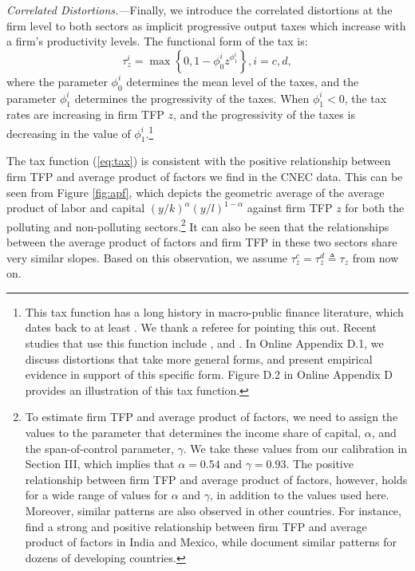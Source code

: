 \documentclass[AEJ]{AEA}
\begin{document}
\textit{Correlated Distortions.---}Finally, we introduce the correlated distortions at the firm level to both sectors as implicit progressive output taxes which increase with a firm's productivity levels. The functional form of the tax is:
\begin{equation}
    \tau^i_z = \max \left\{ 0, 1 - \phi_0^i z^{\phi_1^i} \right\}, i=c,d,
\label{eq:tax}
\end{equation}
where the parameter $\phi_0^i$ determines the mean level of the taxes, and the parameter $\phi_1^i$ determines the progressivity of the taxes. When $\phi_1^i<0$, the tax rates are increasing in firm TFP $z$, and the progressivity of the taxes is decreasing in the value of $\phi_1^i$.\footnote{This tax function has a long history in macro-public finance literature, which dates back to at least \citet{Benabou:2002}. We thank a referee for pointing this out. Recent studies that use this function include \citet{HsiehKlenow:2014}, \citet{BentoRestuccia:2016} and \citet{Guneretal:2017}. In Online Appendix D.1, we discuss distortions that take more general forms, and present empirical evidence in support of this specific form. Figure D.2 in Online Appendix D provides an illustration of this tax function.}

The tax function (\ref{eq:tax}) is consistent with the positive relationship between firm TFP and average product of factors we find in the CNEC data. This can be seen from Figure \ref{fig:apf}, which depicts the geometric average of the average product of labor and capital $(y/k)^\alpha(y/l)^{1-\alpha}$ against firm TFP $z$ for both the polluting and non-polluting sectors.\footnote{To estimate firm TFP and average product of factors, we need to assign the values to the parameter that determines the income share of capital, $\alpha$, and the span-of-control parameter, $\gamma$. We take these values from our calibration in Section III, which implies that $\alpha = \text{0.54}$ and $\gamma = \text{0.93}$. The positive relationship between firm TFP and average product of factors, however, holds for a wide range of values for $\alpha$ and $\gamma$, in addition to the values used here. Moreover, similar patterns are also observed in other countries. For instance, \citet{HsiehKlenow:2014} find a strong and positive relationship between firm TFP and average product of factors in India and Mexico, while \citet{BentoRestuccia:2016} document similar patterns for dozens of developing countries.} It can also be seen that the relationships between the average product of factors and firm TFP in these two sectors share very similar slopes. Based on this observation, we assume $\tau^c_z = \tau^d_z \triangleq \tau_z$ from now on.
\end{document}
